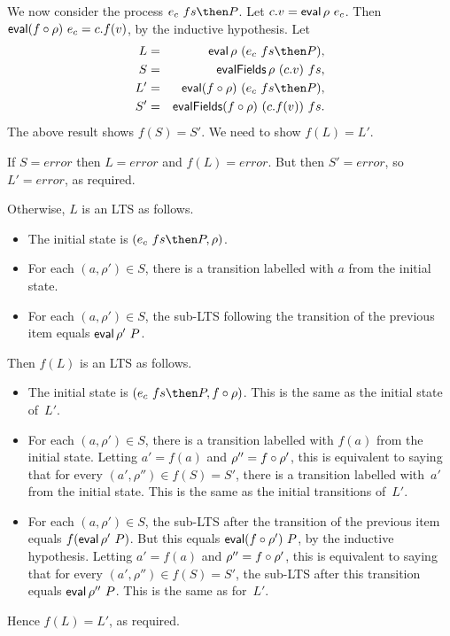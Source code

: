 
We now consider the process $e_c~ fs \then P$.  
Let $c.v = \mathop{\sf eval} \rho~e_c$.  Then
$\mathop{\sf eval} (f\circ\rho)~e_c = c.f(v)$, by the inductive hypothesis. 
Let
%
\begin{eqnarray*}
L & = & \eval \rho~ (e_c~ fs \then P), \\
S & = & \evalFields \rho~(c.v)~fs, \\
L' & = &  \eval (f\after\rho)~ (e_c~fs \then P), \\
S' & = & \evalFields (f\after\rho)~(c.f(v))~fs.
\end{eqnarray*}%
%
The above result shows $f(S) = S'$.  We need to show $f(L) = L'$.

If $S = error$ then $L = error$ and $f(L) = error$.  But then $S' = error$,
so $L' = error$, as required. 

Otherwise, $L$ is an LTS as follows.
%
\begin{itemize}
\item The initial state is $(e_c~ fs \then P, \rho)$.

\item For each $(a, \rho') \in S$, there is a transition labelled with $a$
  from the initial state.  %

\item For each $(a, \rho') \in S$, the sub-LTS following the transition of
  the previous item equals $\mathop{\sf eval} \rho'~ P$.
\end{itemize}
%
Then $f(L)$ is an  LTS as follows.
%
\begin{itemize}
\item The initial state is $(e_c~fs \then P, f\after\rho)$.
  This is the same as the initial state of~$L'$.

\item For each $(a, \rho') \in S$, there is a transition labelled with $f(a)$
  from the initial state.  Letting $a' = f(a)$ and $\rho'' = f\circ\rho'$,
  this is equivalent to saying that for every $(a',\rho'') \in f(S) = S'$,
  there is a transition labelled with~$a'$ from the initial state.  This is
  the same as the initial transitions of~$L'$.

\item For each $(a, \rho') \in S$, the sub-LTS after the transition of the
  previous item equals $f(\mathop{\sf eval} \rho'~ P)$.  But this equals $\mathop{\sf eval}
  (f\circ\rho')~P$, by the inductive hypothesis.  Letting $a' = f(a)$ and
  $\rho'' = f\circ\rho'$, this is equivalent to saying that for every
  $(a',\rho'') \in f(S) = S'$, the sub-LTS after this transition equals $\mathop{\sf eval}
  \rho''~P$.  This is the same as for~$L'$.
\end{itemize} 
%
Hence $f(L) = L'$, as required. 

